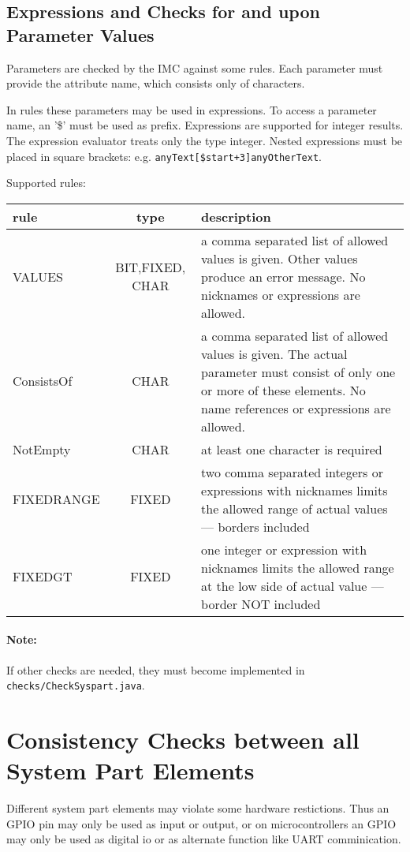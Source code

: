 \subsection{Expressions and Checks for and upon Parameter Values}
Parameters are checked by the IMC against some rules. Each parameter
must provide the attribute name, which  consists only of characters. 

In rules these parameters may be used in expressions.
To access a parameter name, an '\$' must be used as prefix.
Expressions are supported for integer results. The expression 
evaluator treats only the type integer.
Nested expressions must be placed in square brackets:
e.g. \verb|anyText[$start+3]anyOtherText|.


Supported rules:

\begin{tabular}{|l|c|p{8cm}|}
\hline
rule & type & description \\
\hline
VALUES & BIT,FIXED, CHAR &
   a comma separated list of allowed values
   is given. Other values produce an error message. 
No nicknames or expressions are allowed.\\
\hline
ConsistsOf & CHAR &
a comma separated list of allowed values is given. 
The actual parameter must consist of only one or more of these
elements.
No name references or expressions are allowed.\\
\hline
NotEmpty & CHAR & 
   at least one character is required \\   
\hline
FIXEDRANGE & FIXED &
   two comma separated integers or expressions with nicknames
 limits the allowed range
   of actual values --- borders included \\ 
\hline
FIXEDGT & FIXED &
   one integer or expression with nicknames
 limits the allowed range at the low side
   of actual value --- border NOT included \\ 
\hline
\end{tabular}

\paragraph{Note:} If other checks are needed, they must become implemented in 
\verb|checks/CheckSyspart.java|.

\section{Consistency Checks between all System Part Elements}
Different system part elements may violate some hardware restictions.
Thus an GPIO pin may only be used as input or output, or on microcontrollers
an GPIO may only be used as digital io or as alternate function like UART comminication.

